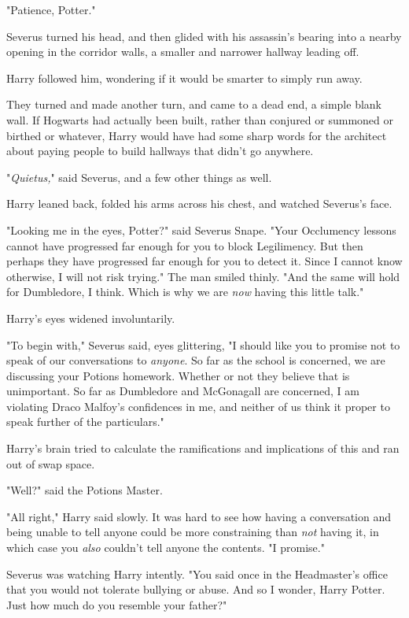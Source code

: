 "Patience, Potter."

Severus turned his head, and then glided with his assassin's bearing into a
nearby opening in the corridor walls, a smaller and narrower hallway leading
off.

Harry followed him, wondering if it would be smarter to simply run away.

They turned and made another turn, and came to a dead end, a simple blank wall.
If Hogwarts had actually been built, rather than conjured or summoned or
birthed or whatever, Harry would have had some sharp words for the architect
about paying people to build hallways that didn't go anywhere.

"\emph{Quietus,}" said Severus, and a few other things as well.

Harry leaned back, folded his arms across his chest, and watched Severus's face.

"Looking me in the eyes, Potter?" said Severus Snape. "Your Occlumency lessons
cannot have progressed far enough for you to block Legilimency. But then
perhaps they have progressed far enough for you to detect it. Since I cannot
know otherwise, I will not risk trying." The man smiled thinly. "And the same
will hold for Dumbledore, I think. Which is why we are \emph{now} having this
little talk."

Harry's eyes widened involuntarily.

"To begin with," Severus said, eyes glittering, "I should like you to promise
not to speak of our conversations to \emph{anyone}. So far as the school is
concerned, we are discussing your Potions homework. Whether or not they believe
that is unimportant. So far as Dumbledore and McGonagall are concerned, I am
violating Draco Malfoy's confidences in me, and neither of us think it proper
to speak further of the particulars."

Harry's brain tried to calculate the ramifications and implications of this and
ran out of swap space.

"Well?" said the Potions Master.

"All right," Harry said slowly. It was hard to see how having a conversation
and being unable to tell anyone could be more constraining than \emph{not}
having it, in which case you \emph{also} couldn't tell anyone the contents. "I
promise."

Severus was watching Harry intently. "You said once in the Headmaster's office
that you would not tolerate bullying or abuse. And so I wonder, Harry Potter.
Just how much do you resemble your father?"

